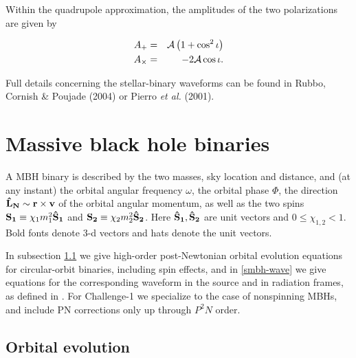 \documentclass[11pt]{report}
\def\bea{\begin{eqnarray}}
\def\eea{\end{eqnarray}}
\def\bSo{{\bf \hat{S}_1}}
\def\bSt{{\bf \hat{S}_2}}
\def\bL{{\bf \hat{L}_{N}}}
\begin{document}
Within the quadrupole approximation, the amplitudes of the two polarizations are given by

\bea
A_+ & = & {\cal A} \left(1 + \cos^2{\iota}\right) \\
A_{\times} & = & -2{\cal A} \cos{\iota}. \\
\eea

Full details concerning the stellar-binary waveforms can be found in Rubbo, Cornish \& Poujade (2004) or Pierro {\it et al.} (2001).




\section{Massive black hole binaries}

A MBH binary is described by the two masses, sky location and distance,  and (at any instant) the
orbital angular frequency $\omega$, the orbital phase $\Phi$,
the direction $\bL \sim \bf{r\times v}$ of the orbital angular momentum, as well as the two spins ${\bf S_1} \equiv  \chi_1m_1^2 \bSo$
and ${\bf S_2} \equiv \chi_2m_2^2 \bSt$.  Here $\bSo, \bSt$ are 
unit vectors and $0\le \chi_{1,2} < 1$. Bold fonts denote 
3-d vectors and hats denote the unit vectors. 

In subsection \ref{orb-ev} we give high-order post-Newtonian orbital evolution equations for circular-orbit
binaries, including spin effects,
and in \ref{smbh-wave} we give equations for the corresponding  waveform in the source and in radiation frames, 
as defined in \cite{FC, Kidder, BCV2}.
For Challenge-1 we specialize to the case of nonspinning MBHs, and include PN corrections only 
up through $P^2N$ order.

\subsection{Orbital evolution}\label{orb-ev}
\end{document}
